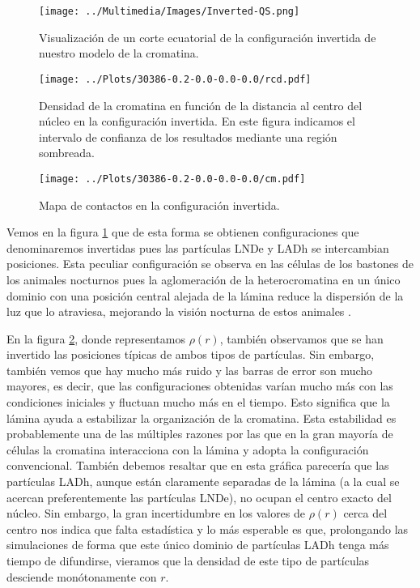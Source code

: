 \begin{figure}[t]
    \centering
    \texttt{[image: ../Multimedia/Images/Inverted-QS.png]}
    \caption{Visualización de un corte ecuatorial de la configuración invertida de nuestro modelo de la cromatina.}
    \label{fig:vmd_QS_image_i}
\end{figure}

\begin{figure}[p]
    \centering
    \texttt{[image: ../Plots/30386-0.2-0.0-0.0-0.0/rcd.pdf]}
    \caption{Densidad de la cromatina en función de la distancia al centro del núcleo en la configuración invertida. En este figura indicamos el intervalo de confianza de los resultados mediante una región sombreada.}
    \label{fig:rcd_i}
\end{figure}

\begin{figure}[p]
    \centering
    \texttt{[image: ../Plots/30386-0.2-0.0-0.0-0.0/cm.pdf]}
    \caption{Mapa de contactos en la configuración invertida.}
    \label{fig:cm_i}
\end{figure}

Vemos en la figura \ref{fig:vmd_QS_image_i} que de esta forma se obtienen configuraciones que denominaremos invertidas pues las partículas LNDe y LADh se intercambian posiciones. Esta peculiar configuración se observa en las células de los bastones de los animales nocturnos pues la aglomeración de la heterocromatina en un único dominio con una posición central alejada de la lámina reduce la dispersión de la luz que lo atraviesa, mejorando la visión nocturna de estos animales \cite{Camara2023}.

En la figura \ref{fig:rcd_i}, donde representamos $\rho(r)$, también observamos que se han invertido las posiciones típicas de ambos tipos de partículas. Sin embargo, también vemos que hay mucho más ruido y las barras de error son mucho mayores, es decir, que las configuraciones obtenidas varían mucho más con las condiciones iniciales y fluctuan mucho más en el tiempo. Esto significa que la lámina ayuda a estabilizar la organización de la cromatina. Esta estabilidad es probablemente una de las múltiples razones por las que en la gran mayoría de células la cromatina interacciona con la lámina y adopta la configuración convencional. También debemos resaltar que en esta gráfica parecería que las partículas LADh, aunque están claramente separadas de la lámina (a la cual se acercan preferentemente las partículas LNDe), no ocupan el centro exacto del núcleo. Sin embargo, la gran incertidumbre en los valores de $\rho(r)$ cerca del centro nos indica que falta estadística y lo más esperable es que, prolongando las simulaciones de forma que este único dominio de partículas LADh tenga más tiempo de difundirse, vieramos que la densidad de este tipo de partículas desciende monótonamente con $r$.

